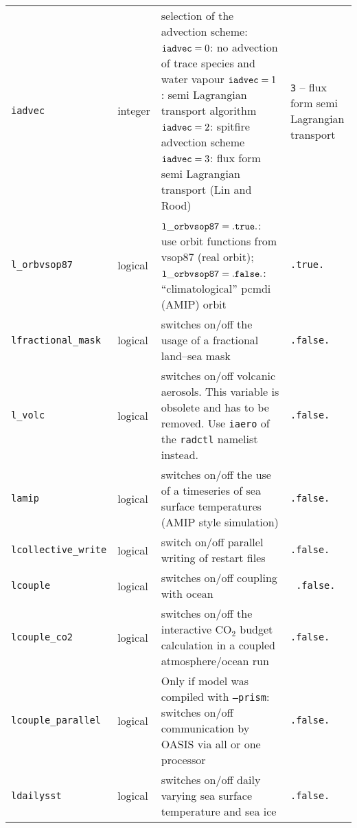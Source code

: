 \begin{longtable}{l@{\extracolsep\fill}lp{}p{3.5cm}}
{\tt iadvec}\index{namelist variables!iadvec}
 & integer     & selection of the advection scheme:\newline 
             ${\tt iadvec}=0$: no advection of trace species and water
             vapour\newline
             ${\tt iadvec}=1$: semi Lagrangian transport
             algorithm\newline
             ${\tt iadvec}=2$: spitfire advection scheme\newline
             ${\tt iadvec}=3$:
             flux form semi Lagrangian transport (Lin and Rood) &
             {\tt 3} -- flux form semi Lagrangian transport \\
{\tt l\_orbvsop87}\index{namelist variables!l\_orbvsop87}
 & logical & ${\tt l\_orbvsop87}={\tt .true.}$: use
orbit functions from 
  vsop87 (real orbit); ${\tt l\_orbvsop87}={\tt .false.}$:
  ``climatological'' pcmdi 
  (AMIP) orbit & {\tt .true.} \\
{\tt lfractional\_mask}\index{namelist variables!lfractional\_mask}
& logical & switches on/off the usage of a fractional land--sea mask &
{\tt .false.} \\
{\tt l\_volc}\index{namelist variables!l\_volc}
 & logical & switches on/off volcanic aerosols. This
variable is obsolete and has to be removed. Use {\tt iaero} of the
{\tt radctl} namelist instead. & {\tt .false.} \\
{\tt lamip}\index{namelist variables!lamip}
 & logical   & switches on/off the use of a timeseries of sea
  surface temperatures (AMIP style simulation) & {\tt .false.} \\
{\tt lcollective\_write} & logical & switch on/off parallel writing of restart
files & {\tt .false.} \\
{\tt lcouple}\index{namelist variables!lcouple} 
 & logical    & switches on/off coupling with ocean & {\tt
    .false.} \\
{\tt lcouple\_co2}\index{namelist variables!lcouple\_co2}
 & logical & switches on/off the interactive CO$_2$
budget calculation in a coupled atmosphere/ocean run & {\tt .false.}
\\
{\tt lcouple\_parallel}\index{namelist variables!lcouple\_parallel}
 & logical & Only if model was compiled with
{\tt --prism}: switches on/off communication by OASIS via all or one
processor & {\tt .false.}\\
{\tt ldailysst}\index{namelist variables!ldailysst}
 & logical   & switches on/off daily varying sea surface
temperature and sea ice & {\tt .false.}\\

\end{longtable}

